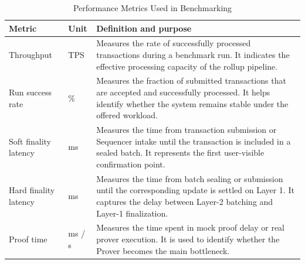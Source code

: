 \begin{table}[!htbp]
\centering
\caption{Performance Metrics Used in Benchmarking}
\label{tab:performance_metrics}
\footnotesize
\setlength{\tabcolsep}{4pt}
\renewcommand{\arraystretch}{1.18}
\begin{tabularx}{\textwidth}{@{}p{}p{}Y@{}}
\toprule
\textbf{Metric} & \textbf{Unit} & \textbf{Definition and purpose} \\
\midrule

Throughput 
& TPS 
& Measures the rate of successfully processed transactions during a benchmark run. It indicates the effective processing capacity of the rollup pipeline. \\

\addlinespace

Run success rate 
& \% 
& Measures the fraction of submitted transactions that are accepted and successfully processed. It helps identify whether the system remains stable under the offered workload. \\

\addlinespace

Soft finality latency 
& ms 
& Measures the time from transaction submission or Sequencer intake until the transaction is included in a sealed batch. It represents the first user-visible confirmation point. \\

\addlinespace

Hard finality latency 
& ms 
& Measures the time from batch sealing or submission until the corresponding update is settled on Layer 1. It captures the delay between Layer-2 batching and Layer-1 finalization. \\

\addlinespace

Proof time 
& ms / s 
& Measures the time spent in mock proof delay or real prover execution. It is used to identify whether the Prover becomes the main bottleneck. \\

\bottomrule
\end{tabularx}
\normalsize
\end{table}

